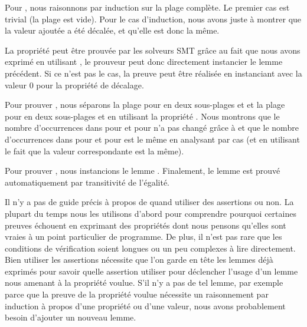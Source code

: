 Pour , nous raisonnons par induction sur la
plage complète. Le premier cas est trivial (la plage est vide). Pour le cas
d'induction, nous avons juste à montrer que la valeur ajoutée a été décalée, et
qu'elle est donc la même.


La propriété  peut être prouvée par les
solveurs SMT grâce au fait que nous avons exprimé  en
utilisant , le prouveur peut donc directement instancier le
lemme précédent. Si ce n'est pas le cas, la preuve peut être réalisée en
instanciant  avec la valeur 0 pour la
propriété de décalage.


Pour prouver , nous séparons la plage
pour  en deux sous-plages  et
 et la plage pour  en deux sous-plages
 et  en utilisant la propriété
. Nous montrons que le nombre d'occurrences
dans  pour  et 
pour  n'a pas changé grâce à 
et que le nombre d'occurrences dans  pour
 et  pour  est le même
en analysant par cas (et en utilisant le fait que la valeur correspondante est
la même).


Pour prouver , nous instancions le lemme
. Finalement, le lemme
 est prouvé automatiquement par transitivité
de l'égalité.




Il n'y a pas de guide précis à propos de quand utiliser des assertions ou non.
La plupart du temps nous les utilisons d'abord pour comprendre pourquoi certaines
preuves échouent en exprimant des propriétés dont nous pensons qu'elles sont vraies
à un point particulier de programme. De plus, il n'est pas rare que les conditions
de vérification soient longues ou un peu complexes à lire directement. Bien
utiliser les assertions nécessite que l'on garde en tête les lemmes déjà exprimés
pour savoir quelle assertion utiliser pour déclencher l'usage d'un lemme nous
amenant à la propriété voulue. S'il n'y a pas de tel lemme, par exemple parce
que la preuve de la propriété voulue nécessite un raisonnement par induction à
propos d'une propriété ou d'une valeur, nous avons probablement besoin d'ajouter
un nouveau lemme.


